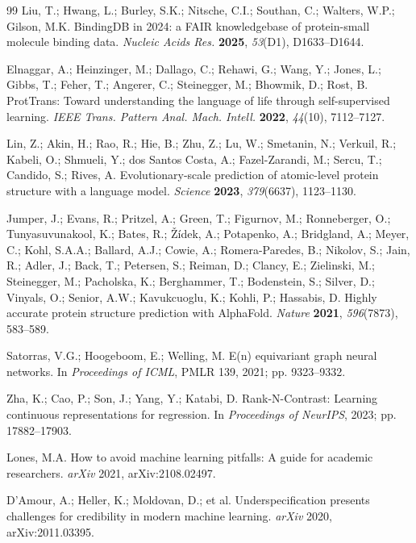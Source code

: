\documentclass[10pt,a4paper,twocolumn]{article}
\begin{document}
\begin{thebibliography}{99}
Liu, T.; Hwang, L.; Burley, S.K.; Nitsche, C.I.; Southan, C.; Walters, W.P.; Gilson, M.K. BindingDB in 2024: a FAIR knowledgebase of protein-small molecule binding data. \textit{Nucleic Acids Res.} \textbf{2025}, \textit{53}(D1), D1633--D1644.


Elnaggar, A.; Heinzinger, M.; Dallago, C.; Rehawi, G.; Wang, Y.; Jones, L.; Gibbs, T.; Feher, T.; Angerer, C.; Steinegger, M.; Bhowmik, D.; Rost, B. ProtTrans: Toward understanding the language of life through self-supervised learning. \textit{IEEE Trans. Pattern Anal. Mach. Intell.} \textbf{2022}, \textit{44}(10), 7112--7127.


Lin, Z.; Akin, H.; Rao, R.; Hie, B.; Zhu, Z.; Lu, W.; Smetanin, N.; Verkuil, R.; Kabeli, O.; Shmueli, Y.; dos Santos Costa, A.; Fazel-Zarandi, M.; Sercu, T.; Candido, S.; Rives, A. Evolutionary-scale prediction of atomic-level protein structure with a language model. \textit{Science} \textbf{2023}, \textit{379}(6637), 1123--1130.


Jumper, J.; Evans, R.; Pritzel, A.; Green, T.; Figurnov, M.; Ronneberger, O.; Tunyasuvunakool, K.; Bates, R.; Žídek, A.; Potapenko, A.; Bridgland, A.; Meyer, C.; Kohl, S.A.A.; Ballard, A.J.; Cowie, A.; Romera-Paredes, B.; Nikolov, S.; Jain, R.; Adler, J.; Back, T.; Petersen, S.; Reiman, D.; Clancy, E.; Zielinski, M.; Steinegger, M.; Pacholska, K.; Berghammer, T.; Bodenstein, S.; Silver, D.; Vinyals, O.; Senior, A.W.; Kavukcuoglu, K.; Kohli, P.; Hassabis, D. Highly accurate protein structure prediction with AlphaFold. \textit{Nature} \textbf{2021}, \textit{596}(7873), 583--589.


Satorras, V.G.; Hoogeboom, E.; Welling, M. E(n) equivariant graph neural networks. In \textit{Proceedings of ICML}, PMLR 139, 2021; pp. 9323--9332.


Zha, K.; Cao, P.; Son, J.; Yang, Y.; Katabi, D. Rank-N-Contrast: Learning continuous representations for regression. In \textit{Proceedings of NeurIPS}, 2023; pp. 17882--17903.

Lones, M.A. How to avoid machine learning pitfalls: A guide for academic researchers. \textit{arXiv} 2021, arXiv:2108.02497.

D'Amour, A.; Heller, K.; Moldovan, D.; et al. Underspecification presents challenges for credibility in modern machine learning. \textit{arXiv} 2020, arXiv:2011.03395.

\end{thebibliography}
\end{document}
